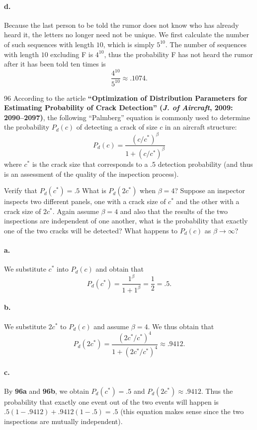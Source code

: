 \documentclass{exam}
\begin{document}
\paragraph{d.} Because the last person to be told the rumor does not know who has already heard it, the letters no longer need not be unique. We first calculate the number of such sequences with length $10$, which is simply $5^{10}$. The number of sequences with length $10$ excluding F is $4^{10}$, thus the probability F has not heard the rumor after it has been told ten times is
\[
	\frac{4^{10}}{5^{10}} \approx .1074.
\]

\begin{problem}{96}
	According to the article \textbf{``Optimization of Distribution Parameters for Estimating Probability of Crack Detection'' (\textit{J. of Aircraft}, 2009: 2090--2097)}, the following ``Palmberg'' equation is commonly used to determine the probability $P_d(c)$ of detecting a crack of size $c$ in an aircraft structure:
	\[
		P_d(c) = \frac{(c/c^*)^\beta}{1 + (c/c^*)^\beta}
	\]
	where $c^*$ is the crack size that corresponds to a .5 detection probability (and thus is an assessment of the quality of the inspection process).
	\begin{tasks}[label=\textbf{\alph*.}]
		\task Verify that $P_d(c^*) = .5$
		\task What is $P_d(2c^*)$ when $\beta = 4$?
		\task Suppose an inspector inspects two different panels, one with a crack size of $c^*$ and the other with a crack size of $2c^*$. Again assume $\beta = 4$ and also that the results of the two inspections are independent of one another, what is the probability that exactly one of the two cracks will be detected?
		\task What happens to $P_d(c)$ as $\beta \to \infty$?
	\end{tasks}
\end{problem}

\paragraph{a.} We substitute $c^*$ into $P_d(c)$ and obtain that
\[
	P_d(c^*) = \frac{1^\beta}{1 + 1^\beta} = \frac12 = .5.
\]

\paragraph{b.} We substitute $2c^*$ to $P_d(c)$ and assume $\beta = 4$. We thus obtain that
\[
	P_d(2c^*) = \frac{(2c^*/c^*)^4}{1 + (2c^*/c^*)^4} \approx .9412.
\]

\paragraph{c.} By \textbf{96a} and \textbf{96b}, we obtain $P_d(c^*) = .5$ and $P_d(2c^*) \approx .9412$. Thus the probability that exactly one event out of the two events will happen is $.5(1 - .9412) + .9412(1 - .5) = .5$ (this equation makes sense since the two inspections are mutually independent).
\end{document}
